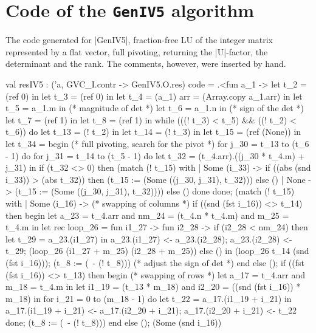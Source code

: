 \documentclass{elsart}
\begin{document}
\section{Code of the \texttt{GenIV5} algorithm}
\label{app:code-GenIV5}
The code generated for |GenIV5|, fraction-free LU of the integer matrix
represented by a flat vector, full pivoting, returning the |U|-factor,
the determinant and the rank.  The comments, however, were inserted by
hand.
\begin{code2}
val resIV5 : ('a, GVC_I.contr -> GenIV5.O.res) code =
  .<fun a_1 ->
   let t_2 = (ref 0) in
   let t_3 = (ref 0) in
   let t_4 = (a_1) {arr = (Array.copy a_1.arr)} in
   let t_5 = a_1.m in  (* magnitude of det *)
   let t_6 = a_1.n in  (* sign of the det *)
   let t_7 = (ref 1) in
   let t_8 = (ref 1) in
   while (((! t_3) < t_5) && ((! t_2) < t_6)) do
    let t_13 = (! t_2) in
    let t_14 = (! t_3) in
    let t_15 = (ref (None)) in
    let t_34 =
     begin (* full pivoting, search for the pivot *)
      for j_30 = t_13 to (t_6 - 1) do
       for j_31 = t_14 to (t_5 - 1) do
        let t_32 = (t_4.arr).((j_30 * t_4.m) + j_31) in
        if (t_32 <> 0) then
         (match (! t_15) with
          | Some (i_33) ->
             if ((abs (snd i_33)) > (abs t_32)) then
              (t_15 := (Some ((j_30, j_31), t_32)))
             else ()
          | None -> (t_15 := (Some ((j_30, j_31), t_32))))
        else ()
       done
      done;
      (match (! t_15) with
       | Some (i_16) -> (* swapping of columns *)
          if ((snd (fst i_16)) <> t_14) then begin
           let a_23 = t_4.arr
           and nm_24 = (t_4.n * t_4.m)
           and m_25 = t_4.m in
           let rec loop_26 =
            fun i1_27 ->
             fun i2_28 ->
              if (i2_28 < nm_24) then
               let t_29 = a_23.(i1_27) in
               a_23.(i1_27) <- a_23.(i2_28);
               a_23.(i2_28) <- t_29;
               (loop_26 (i1_27 + m_25) (i2_28 + m_25))
              else () in
           (loop_26 t_14 (snd (fst i_16)));
           (t_8 := (~- (! t_8))) (* adjust the sign of det *)
          end else ();
          if ((fst (fst i_16)) <> t_13) then begin (* swapping of rows *)
           let a_17 = t_4.arr and m_18 = t_4.m in
           let i1_19 = (t_13 * m_18) and i2_20 = ((snd (fst i_16)) * m_18) in
           for i_21 = 0 to (m_18 - 1) do
            let t_22 = a_17.(i1_19 + i_21) in
            a_17.(i1_19 + i_21) <- a_17.(i2_20 + i_21);
            a_17.(i2_20 + i_21) <- t_22
           done;
           (t_8 := (~- (! t_8)))
          end else ();
          (Some (snd i_16))

\end{code2}
\end{document}
